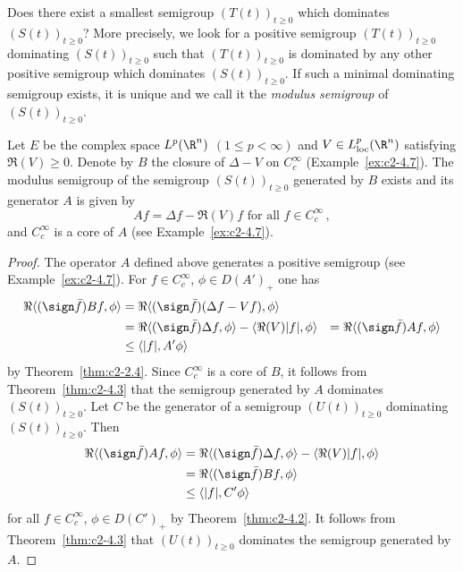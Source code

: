 Does there exist a smallest semigroup $(T(t))_{t \geq 0}$ which dominates $(S(t))_{t \geq 0}$?
More precisely, we look for a positive semigroup $(T(t))_{t \geq 0}$ dominating $(S(t))_{t \geq 0}$ such that $(T(t))_{t \geq 0}$ is dominated
by any other positive semigroup which dominates $(S(t))_{t \geq 0}$.
If such a minimal dominating semigroup exists, it is unique and we call it the
\emph{modulus semigroup} of\/ $(S(t))_{t \geq 0}$.
\begin{example}
\label{ex:c2-4.15}
\quad Let $E$ be the complex space $L^{p}(\R^{n})$ $(1 \leq p < \infty)$ and $V \in L^{p}_{\text{loc}}(\R^{n})$ satisfying $\Re(V) \geq 0$.
Denote by $B$ the closure of\/ $\Delta - V$ on $C^{\infty}_{c}$
(\cf Example~\ref{ex:c2-4.7}).
The modulus semigroup of the semigroup $(S(t))_{t \geq 0}$ generated by $B$ exists and its generator $A$ is given by 
\[
Af = \Delta f - \Re(V)f \text{ for all } f \in C^{\infty}_{c}\,,
\]
and $C^{\infty}_{c}$ is a core of\/ $A$ (see Example~\ref{ex:c2-4.7}).
\end{example}
\begin{proof}
The operator $A$ defined above generates a positive semigroup (see Example~\ref{ex:c2-4.7}).
For $f \in C^{\infty}_{c}$, $\phi \in D(A')_{+}$ one has
\begin{align*}
\Re\langle(\sign  \bar{f})Bf,\phi\rangle &= \Re\langle(\sign  \bar{f})(\Delta f - Vf),\phi\rangle \\
&=\Re\langle(\sign  \bar{f})\Delta f,\phi\rangle - \langle\Re(V)|f|,\phi\rangle &= \Re\langle(\sign  \bar{f})Af,\phi\rangle \\
&\leq \langle|f|,A'\phi\rangle 
\end{align*}
by Theorem~\ref{thm:c2-2.4}.
Since $C^{\infty}_{c}$ is a core of\/ $B$, it follows from Theorem~\ref{thm:c2-4.3}   that the semigroup generated by $A$ dominates $(S(t))_{t \geq 0}$.
Let $C$ be the generator of a semigroup $(U(t))_{t \geq 0}$ dominating $(S(t))_{t \geq 0}$.
Then
\begin{align*}
\Re\langle(\sign  \bar{f})Af,\phi\rangle &= \Re\langle(\sign  \bar{f})\Delta f,\phi\rangle - \langle\Re(V)|f|,\phi\rangle \\
&= \Re\langle(\sign  \bar{f})Bf,\phi\rangle\\
&\leq \langle|f|,C'\phi\rangle 
\end{align*}
for all  $f \in C^{\infty}_{c}$, $\phi \in D(C')_{+}$  by Theorem~\ref{thm:c2-4.2}. 
It follows from Theorem~\ref{thm:c2-4.3}   that $(U(t))_{t \geq 0}$ dominates the semigroup generated by $A$.
\end{proof}
